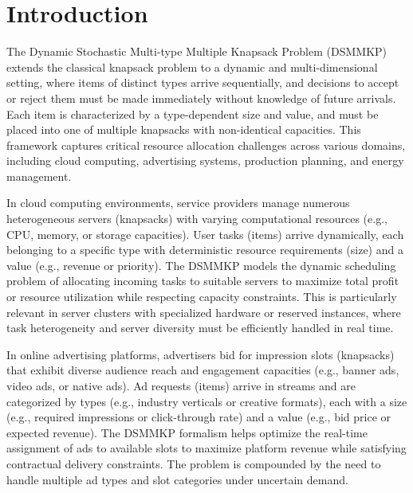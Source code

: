 


\section{Introduction}
The Dynamic Stochastic Multi-type Multiple Knapsack Problem (DSMMKP) extends the classical knapsack problem to a dynamic and multi-dimensional setting, where items of distinct types arrive sequentially, and decisions to accept or reject them must be made immediately without knowledge of future arrivals. Each item is characterized by a type-dependent size and value, and must be placed into one of multiple knapsacks with non-identical capacities. This framework captures critical resource allocation challenges across various domains, including cloud computing, advertising systems, production planning, and energy management.


In cloud computing environments, service providers manage numerous heterogeneous servers (knapsacks) with varying computational resources (e.g., CPU, memory, or storage capacities). User tasks (items) arrive dynamically, each belonging to a specific type with deterministic resource requirements (size) and a value (e.g., revenue or priority). The DSMMKP models the dynamic scheduling problem of allocating incoming tasks to suitable servers to maximize total profit or resource utilization while respecting capacity constraints. This is particularly relevant in server clusters with specialized hardware or reserved instances, where task heterogeneity and server diversity must be efficiently handled in real time.


In online advertising platforms, advertisers bid for impression slots (knapsacks) that exhibit diverse audience reach and engagement capacities (e.g., banner ads, video ads, or native ads). Ad requests (items) arrive in streams and are categorized by types (e.g., industry verticals or creative formats), each with a size (e.g., required impressions or click-through rate) and a value (e.g., bid price or expected revenue). The DSMMKP formalism helps optimize the real-time assignment of ads to available slots to maximize platform revenue while satisfying contractual delivery constraints. The problem is compounded by the need to handle multiple ad types and slot categories under uncertain demand.


